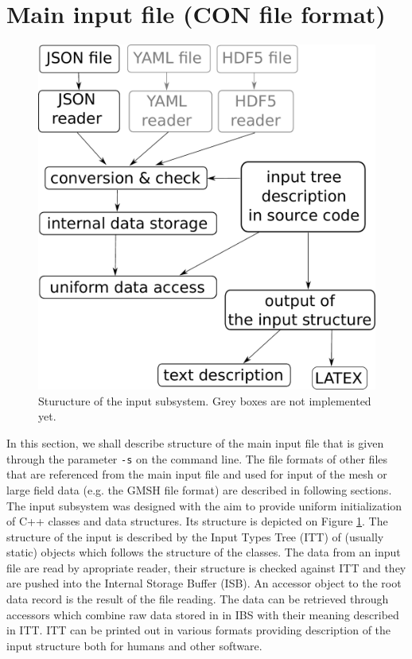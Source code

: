 

\section{Main input file (CON file format)}
\label{sec:CONformat}

\begin{figure}
 \begin{center}
 \includegraphics[scale=0.4]{./input_subsystem.pdf}
 \caption{Sturucture of the input subsystem. Grey boxes are not implemented yet.}
 \label{fig:input_subsystem}
 \end{center}
\end{figure}

In this section, we shall describe structure of the main input file that is given through the parameter \verb'-s' on the command line.
The file formats of other files that are referenced from the main input file and used for input of the mesh or large field data
(e.g. the GMSH file format) are described in following sections. The input subsystem was designed with the aim to provide uniform initialization of 
C++ classes and data structures. Its structure is depicted on Figure \ref{fig:input_subsystem}.
The structure of the input is described by the Input Types Tree (ITT) of (usually static) objects which follows the structure of the classes.
The data from an input file are read by apropriate reader, their structure is checked against ITT and they are pushed into the Internal Storage Buffer (ISB).
An accessor object to the root data record is the result of the file reading. The data can be retrieved through accessors which combine 
raw data stored in in IBS with their meaning described in ITT. ITT can be printed out in various formats providing description of the input structure both for 
humans and other software.

